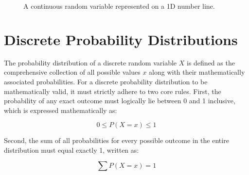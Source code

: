 \documentclass[12pt]{scrartcl}
\begin{document}
\begin{figure}[h]
\centering
{}
\caption{A continuous random variable represented on a 1D number line.}
\end{figure}

\section{Discrete Probability Distributions}
The probability distribution of a discrete random variable $X$ is defined as the comprehensive collection of all possible values $x$ along with their mathematically associated probabilities. For a discrete probability distribution to be mathematically valid, it must strictly adhere to two core rules. First, the probability of any exact outcome must logically lie between 0 and 1 inclusive, which is expressed mathematically as:

\[
0 \le P(X=x) \le 1
\]

Second, the sum of all probabilities for every possible outcome in the entire distribution must equal exactly 1, written as:

\[
\sum{P(X=x)=1}
\]
\end{document}
